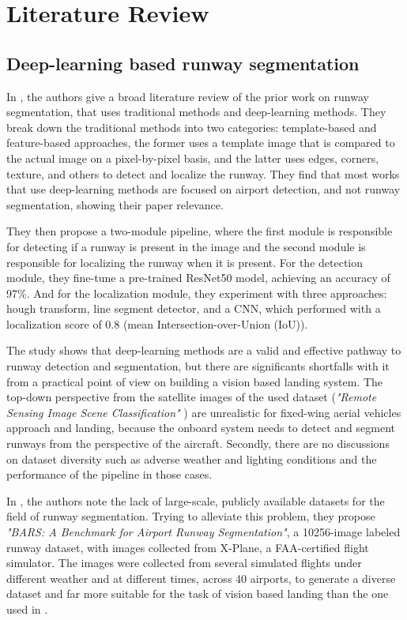 \chapter{Literature Review}

\section{Deep-learning based runway segmentation}

In \cite{akbar_runway_2019}, the authors give a broad literature review of the prior work on runway segmentation, that uses traditional methods and deep-learning methods. They break down the traditional methods into two categories: template-based and feature-based approaches, the former uses a template image that is compared to the actual image on a pixel-by-pixel basis, and the latter uses edges, corners, texture, and others to detect and localize the runway. They find that most works that use deep-learning methods are focused on airport detection, and not runway segmentation, showing their paper relevance.

They then propose a two-module pipeline, where the first module is responsible for detecting if a runway is present in the image and the second module is responsible for localizing the runway when it is present. For the detection module, they fine-tune a pre-trained ResNet50 model, achieving an accuracy of 97\%. And for the localization module, they experiment with three approaches: hough transform, line segment detector, and a CNN, which performed with a localization score of 0.8 (mean Intersection-over-Union (IoU)).

The study shows that deep-learning methods are a valid and effective pathway to runway detection and segmentation, but there are significants shortfalls with it from a practical point of view on building a vision based landing system.  The top-down perspective from the satellite images of the used dataset (\emph{"Remote Sensing Image Scene Classification"} \cite{cheng_remote_2017}) are unrealistic for fixed-wing aerial vehicles approach and landing, because the onboard system needs to detect and segment runways from the perspective of the aircraft. Secondly, there are no discussions on dataset diversity such as adverse weather and lighting conditions and the performance of the pipeline in those cases.

In \cite{chen_bars_2023}, the authors note the lack of large-scale, publicly available datasets for the field of runway segmentation. Trying to alleviate this problem, they propose \emph{"BARS: A Benchmark for Airport Runway Segmentation"}, a 10256-image labeled runway dataset, with images collected from X-Plane, a FAA-certified flight simulator. The images were collected from several simulated flights under different weather and at different times, across 40 airports, to generate a diverse dataset and far more suitable for the task of vision based landing than the one used in \cite{akbar_runway_2019}.

